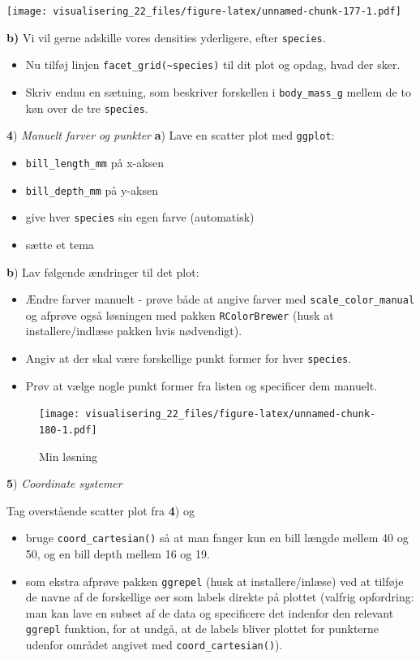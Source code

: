 \documentclass[
]{book}
\providecommand{\tightlist}{%
  \setlength{\itemsep}{0pt}\setlength{\parskip}{0pt}}
\begin{document}
\texttt{[image: visualisering\_22\_files/figure-latex/unnamed-chunk-177-1.pdf]}

\textbf{b)} Vi vil gerne adskille vores densities yderligere, efter \texttt{species}.

\begin{itemize}
\tightlist
\item
  Nu tilføj linjen \texttt{facet\_grid(\textasciitilde{}species)} til dit plot og opdag, hvad der sker.
\item
  Skriv endnu en sætning, som beskriver forskellen i \texttt{body\_mass\_g} mellem de to køn over de tre \texttt{species}.
\end{itemize}

\textbf{4}) \emph{Manuelt farver og punkter} \textbf{a}) Lave en scatter plot med \texttt{ggplot}:

\begin{itemize}
\tightlist
\item
  \texttt{bill\_length\_mm} på x-aksen
\item
  \texttt{bill\_depth\_mm} på y-aksen
\item
  give hver \texttt{species} sin egen farve (automatisk)
\item
  sætte et tema
\end{itemize}

\textbf{b}) Lav følgende ændringer til det plot:

\begin{itemize}
\tightlist
\item
  Ændre farver manuelt - prøve både at angive farver med \texttt{scale\_color\_manual} og afprøve også løsningen med pakken \texttt{RColorBrewer} (husk at installere/indlæse pakken hvis nødvendigt).
\item
  Angiv at der skal være forskellige punkt former for hver \texttt{species}.
\item
  Prøv at vælge nogle punkt former fra listen og specificer dem manuelt.
\end{itemize}

\begin{figure}
\centering
\texttt{[image: visualisering\_22\_files/figure-latex/unnamed-chunk-180-1.pdf]}
\caption{\label{fig:unnamed-chunk-180}Min løsning}
\end{figure}

\textbf{5}) \emph{Coordinate systemer}

Tag overstående scatter plot fra \textbf{4}) og

\begin{itemize}
\tightlist
\item
  bruge \texttt{coord\_cartesian()} så at man fanger kun en bill længde mellem 40 og 50, og en bill depth mellem 16 og 19.\\
\item
  som ekstra afprøve pakken \texttt{ggrepel} (husk at installere/inlæse) ved at tilføje de navne af de forskellige øer som labels direkte på plottet (valfrig opfordring: man kan lave en subset af de data og specificere det indenfor den relevant \texttt{ggrepl} funktion, for at undgå, at de labels bliver plottet for punkterne udenfor området angivet med \texttt{coord\_cartesian()}).
\end{itemize}
\end{document}
